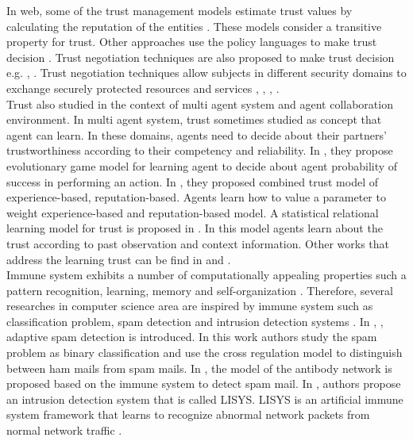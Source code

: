 \documentclass{llncs}
\begin{document}
In web, some of the trust management models estimate trust values by calculating the reputation of the entities \cite{reputationWeb}. These models consider a transitive property for trust.  Other approaches  use the policy languages to make trust decision \cite{trustpolicy}.  Trust negotiation techniques are also proposed to make trust decision e.g. \cite{Winslett}, \cite{Winslett2}. Trust negotiation techniques allow subjects in different security domains to exchange securely protected resources and services \cite{Squicciarini}, \cite{Koshutanski}, \cite{Winsborough}, \cite{Winsborough2}. \\

Trust also studied in the context of multi agent system and agent collaboration environment. In multi agent system, trust sometimes studied as concept that agent can learn. In these domains, agents need to decide about their partners’ trustworthiness according to their competency and reliability.  In \cite{competent}, they propose evolutionary game model for learning agent
to decide about agent probability of success in performing an action. In \cite{experince}, they proposed combined trust model of experience-based, reputation-based. Agents learn how to value a parameter to weight experience-based and reputation-based model.  A statistical relational learning model for trust is proposed in \cite{statistical}. In this model agents learn about the trust according to past observation and context information. 
Other works that address the learning trust can be find in \cite{inittrust} and \cite{taskspecific}.\\

Immune system exhibits a number of computationally appealing properties such a pattern recognition, learning, memory and self-organization \cite{aisLearning}. Therefore, several researches in computer science area are inspired by immune system such as classification problem, spam detection and intrusion detection systems  \cite{Forrest1}.  In \cite{Al1}, \cite{Al2}, adaptive spam detection is introduced. In this work authors study the spam problem as binary classification and use the cross regulation model to distinguish between ham mails from spam mails. In \cite{spam}, the model of the antibody network is proposed based on the immune system to detect spam mail. In \cite{Forrest2},  authors propose  an intrusion detection system that is called LISYS.  LISYS is an artificial immune system framework that learns to recognize abnormal network packets from normal network traffic \cite{LISYS}.
\end{document}
